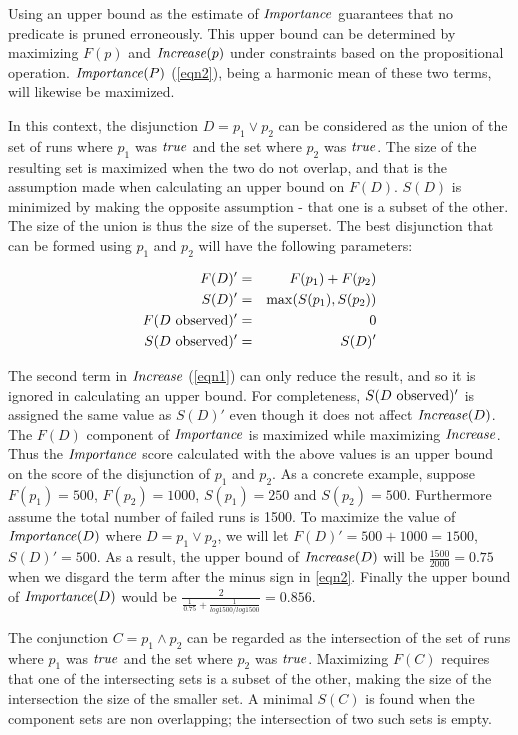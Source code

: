 Using an upper bound as the estimate of $\mathit{Importance}$ guarantees that no predicate is pruned erroneously.  This upper bound can be determined by maximizing $F(p)$ and $\mathit{Increase}(p)$ under constraints based on the propositional operation.  $\mathit{Importance}(P)$ (\autoref{eqn2}), being a harmonic mean of these two terms, will likewise be maximized.

In this context, the disjunction $D = p_1 \vee p_2$ can be considered as the union of the set of runs where $p_1$ was $\mathit{true}$ and the set where $p_2$ was $\mathit{true}$.  The size of the resulting set is maximized when the two do not overlap, and that is the assumption made when calculating an upper bound on $F(D)$.  $S(D)$ is minimized by making the opposite assumption - that one is a subset of the other.  The size of the union is thus the size of the superset.  The best disjunction that can be formed using $p_1$ and $p_2$ will have the following parameters:

\begin{eqnarray*}
  F(D)' &=&  F(p_1) + F(p_2) \\
  S(D)' &=&  \max(S(p_1),S(p_2)) \\
  F(\text{$D$ observed})' &=& 0 \\
  S(\text{$D$ observed})' &=& S(D)'
\end{eqnarray*}

The second term in $\mathit{Increase}$ (\autoref{eqn1}) can only reduce the result, and so it is ignored in calculating an upper bound.  For completeness, $S(\text{$D$ observed})'$ is assigned the same value as $S(D)'$ even though it does not affect $\mathit{Increase}(D)$.  The $F(D)$ component of $\mathit{Importance}$ is maximized while maximizing $\mathit{Increase}$.  Thus the $\mathit{Importance}$ score calculated with the above values is an upper bound on the score of the disjunction of $p_1$ and $p_2$. As a concrete example, suppose $F(p_1) = 500$, $F(p_2) = 1000$, $S(p_1) = 250$ and $S(p_2) = 500$. Furthermore assume the total number of failed runs is 1500. To maximize the value of $\mathit{Importance}(D)$ where $D = p_1 \vee p_2$,  we will let $F(D)' = 500 + 1000 = 1500$, $S(D)' = 500$. As a result, the upper bound of $\mathit{Increase}(D)$ will be $\frac{1500}{2000}=0.75$ when we disgard the term after the minus sign in \autoref{eqn2}. Finally the upper bound of $\mathit{Importance}(D)$ would be $\frac{2}{\frac{1}{0.75}+\frac{1}{log1500/log1500}} = 0.856$. 

The conjunction $C = p_1 \wedge p_2$ can be regarded as the intersection of the set of runs where $p_1$ was $\mathit{true}$ and the set where $p_2$ was $\mathit{true}$.  Maximizing $F(C)$ requires that one of the intersecting sets is a subset of the other, making the size of the intersection the size of the smaller set.  A minimal $S(C)$ is found when the component sets are non overlapping; the intersection of two such sets is empty.

